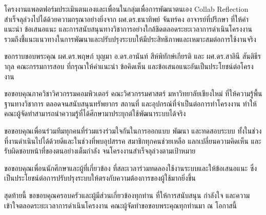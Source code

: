 \ifproject
\begin{acknowledgments}
โครงงานแพลตฟอร์มประเมินตนเองและเพื่อนในกลุ่มเพื่อการพัฒนาตนเอง Collab Reflection สำเร็จลุล่วงไปได้ด้วยความกรุณาอย่างยิ่งจาก ผศ.ดร.ธนาทิพย์ จันทร์คง อาจารย์ที่ปรึกษา ที่ให้คำแนะนำ ข้อเสนอแนะ และการสนับสนุนทางวิชาการอย่างใกล้ชิดตลอดระยะเวลาการดำเนินโครงงาน รวมถึงชี้แนะแนวทางในการพัฒนาและปรับปรุงระบบให้มีประสิทธิภาพและเหมาะสมต่อการใช้งานจริง

ขอกราบขอบพระคุณ ผศ.ดร.พฤษภ์ บุญมา อ.ดร.อานันท์ สีห์พิทักษ์เกียรติ และ ผศ.ดร.สาลินี สันติธีรากุล คณะกรรมการสอบ ที่กรุณาให้คำแนะนำ ข้อคิดเห็น และข้อเสนอแนะอันเป็นประโยชน์ต่อโครงงาน

ขอขอบคุณภาควิชาวิศวกรรมคอมพิวเตอร์ คณะวิศวกรรมศาสตร์ มหาวิทยาลัยเชียงใหม่ ที่ให้ความรู้พื้นฐานทางวิชาการ ตลอดจนสนับสนุนทรัพยากร สถานที่ และอุปกรณ์ที่จำเป็นต่อการทำโครงงาน ทำให้คณะผู้จัดทำสามารถนำความรู้ที่ได้ศึกษามาประยุกต์ใช้พัฒนาระบบได้จริง

ขอขอบคุณเพื่อนร่วมทีมทุกคนที่ร่วมแรงร่วมใจกันในการออกแบบ พัฒนา และทดสอบระบบ ทั้งในช่วงที่งานดำเนินไปได้ด้วยดีและในช่วงที่พบอุปสรรค สมาชิกทุกคนช่วยเหลือ แลกเปลี่ยนความคิดเห็น และรับผิดชอบหน้าที่ของตนอย่างเต็มกำลัง จนโครงงานสำเร็จลุล่วงตามเป้าหมาย

ขอขอบคุณเพื่อนนักศึกษาและผู้ที่เกี่ยวข้อง ที่สละเวลาร่วมทดลองใช้งานระบบและให้ข้อเสนอแนะ ซึ่งเป็นประโยชน์ต่อการปรับปรุงระบบให้ตรงกับความต้องการของผู้ใช้มากยิ่งขึ้น

สุดท้ายนี้ ขอขอบคุณครอบครัวและผู้มีส่วนเกี่ยวข้องทุกท่าน ที่ให้การสนับสนุน กำลังใจ และความเข้าใจตลอดระยะเวลาการดำเนินโครงงาน คณะผู้จัดทำขอขอบพระคุณทุกท่านมา ณ โอกาสนี้

\end{acknowledgments}%
\fi %

\contentspage

\figurelistpage

\tablelistpage



